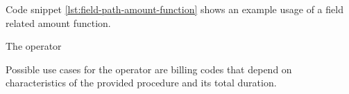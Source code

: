Code snippet \ref{lst:field-path-amount-function} shows an example usage of a field related amount function.




The  operator


Possible use cases for the  operator are billing codes that depend on characteristics of the provided procedure and its total duration.

